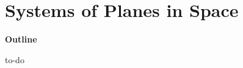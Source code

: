 \documentclass[00-livre-main.tex]{subfiles}
\begin{document}
\chapter{Systems of Planes in Space}

\textbf{Outline}
\begin{compactitem}
\item to-do
\end{compactitem}
\end{document}
